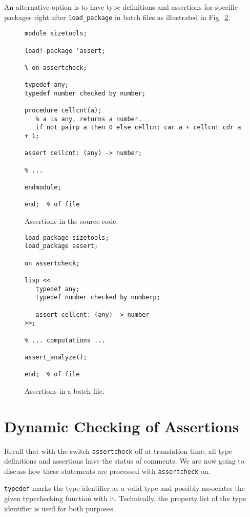 \documentclass{article}
\begin{document}
An alternative option is to have type definitions and assertions for
specific packages right after \texttt{load\_package} in batch files as
illustrated in Fig.~\ref{FIG:assBat}.
\begin{figure}
  \begin{small}
\begin{verbatim}
module sizetools;

load!-package 'assert;

% on assertcheck;

typedef any;
typedef number checked by number;

procedure cellcnt(a);
   % a is any, returns a number.
   if not pairp a then 0 else cellcnt car a + cellcnt cdr a + 1;

assert cellcnt: (any) -> number;

% ...

endmodule;

end;  % of file
\end{verbatim}
  \end{small}
  \caption{Assertions in the source code.\label{FIG:assMod}}
\end{figure}

\begin{figure}
  \begin{small}
\begin{verbatim}
load_package sizetools;
load_package assert;

on assertcheck;

lisp <<
   typedef any;
   typedef number checked by numberp;

   assert cellcnt: (any) -> number
>>;

% ... computations ...

assert_analyze();

end;  % of file
\end{verbatim}
  \end{small}
  \caption{Assertions in a batch file.\label{FIG:assBat}}
\end{figure}

\section{Dynamic Checking of Assertions}
Recall that with the switch \texttt{assertcheck} off at translation
time, all type definitions and assertions have the status of comments.
We are now going to discuss how these statements are processed with
\texttt{assertcheck} on.

\texttt{typedef} marks the type identifier as a valid type and possibly
associates the given typechecking function with it. Technically, the
property list of the type identifier is used for both purposes.
\end{document}
